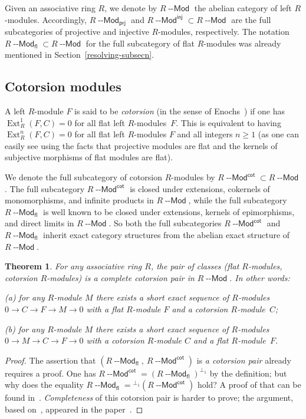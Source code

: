 \documentclass[12pt,a4paper]{amsart}
\newcommand{\+}{\nobreakdash-}
\renewcommand{\:}{\colon}
\newcommand{\rarrow}{\longrightarrow}
\DeclareMathOperator{\Ext}{Ext}
\newcommand{\Modl}{{\operatorname{\mathsf{--Mod}}}}
\newcommand{\prj}{\mathsf{prj}}
\newcommand{\inj}{\mathsf{inj}}
\newcommand{\fl}{\mathsf{fl}}
\renewcommand{\cot}{\mathsf{cot}}
\theoremstyle{plain}
\newtheorem{thm}{Theorem}[section]
\theoremstyle{definition}
\begin{document}
 Given an associative ring $R$, we denote by $R\Modl$ the abelian
category of left $R$\+modules.
 Accordingly, $R\Modl_\prj$ and $R\Modl^\inj\subset R\Modl$ are the full
subcategories of projective and injective $R$\+modules, respectively.
 The notation $R\Modl_\fl\subset R\Modl$ for the full subcategory
of flat $R$\+modules was already mentioned in
Section~\ref{resolving-subsecn}.

\subsection{Cotorsion modules} \label{cotorsion-modules-subsecn}
 A left $R$\+module $F$ is said to be \emph{cotorsion} (in the sense
of Enochs~\cite{En2}) if one has $\Ext_R^1(F,C)=0$ for all flat
left $R$\+modules~$F$.
 This is equivalent to having $\Ext_R^n(F,C)=0$ for all flat left
$R$\+modules $F$ and all integers $n\ge1$ (as one can easily see
using the facts that projective modules are flat and the kernels of
subjective morphisms of flat modules are flat).

 We denote the full subcategory of cotorsion $R$\+modules by
$R\Modl^\cot\subset R\Modl$.
 The full subcategory $R\Modl^\cot$ is closed under extensions,
cokernels of monomorphisms, and infinite products in $R\Modl$,
while the full subcategory $R\Modl_\fl$ is well known to be closed
under extensions, kernels of epimorphisms, and direct limits in
$R\Modl$.
 So both the full subcategories $R\Modl^\cot$ and $R\Modl_\fl$
inherit exact category structures from the abelian exact structure
of $R\Modl$.

\begin{thm} \label{flat-cotorsion-pair}
 For any associative ring $R$, the pair of classes (flat $R$\+modules,
cotorsion $R$\+modules) is a complete cotorsion pair in $R\Modl$.
 In other words: \par
\textup{(a)} for any $R$\+module $M$ there exists a short exact
sequence of $R$\+modules\/ $0\rarrow C\rarrow F\rarrow M\rarrow0$
with a flat $R$\+module $F$ and a cotorsion $R$\+module~$C$; \par
\textup{(b)} for any $R$\+module $M$ there exists a short exact
sequence of $R$\+modules\/ $0\rarrow M\rarrow C\rarrow F\rarrow0$
with a cotorsion $R$\+module $C$ and a flat $R$\+module~$F$.
\end{thm}

\begin{proof}
 The assertion that $(R\Modl_\fl,\allowbreak\>R\Modl^\cot)$ is
\emph{a cotorsion pair} already requires a proof.
 One has $R\Modl^\cot=(R\Modl_\fl)^{\perp_1}$ by the definition; but
why does the equality $R\Modl_\fl={}^{\perp_1}(R\Modl^\cot)$ hold?
 A proof of that can be found in~\cite[Lemma~3.4.1]{Xu}.
 \emph{Completeness} of this cotorsion pair is harder to prove;
the argument, based on~\cite[Theorems~2 and~10]{ET}, appeared
in the paper~\cite[Section~2]{BBE}.
\end{proof}
\end{document}
